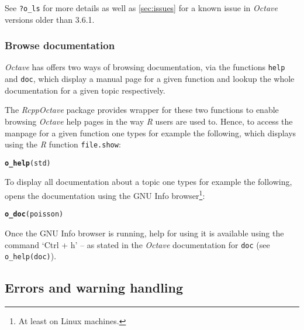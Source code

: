 \documentclass[english,10pt,a4paper]{article}\usepackage[]{graphicx}\usepackage[]{color}
\makeatletter
\newcommand{\hlstd}[1]{\textcolor[rgb]{0.345,0.345,0.345}{#1}}%
\newcommand{\hlkwd}[1]{\textcolor[rgb]{0.737,0.353,0.396}{\textbf{#1}}}%
\newenvironment{kframe}{%
 \def\at@end@of@kframe{}%
 \ifinner\ifhmode%
  \def\at@end@of@kframe{\end{minipage}}%
  \begin{minipage}{\columnwidth}%
 \fi\fi%
 \def\FrameCommand##1{\hskip\@totalleftmargin \hskip-\fboxsep
 \colorbox{shadecolor}{##1}\hskip-\fboxsep
     \hskip-\linewidth \hskip-\@totalleftmargin \hskip\columnwidth}%
 \MakeFramed {\advance\hsize-\width
   \@totalleftmargin\z@ \linewidth\hsize
   \@setminipage}}%
 {\par\unskip\endMakeFramed%
 \at@end@of@kframe}
\newenvironment{knitrout}{}{} %
\let\proglang=\textit
\let\code=\texttt
\newcommand{\pkgname}[1]{\textit{#1}\xspace}
\newcommand{\Rpkg}[1]{\pkgname{#1} package\xspace}
\newcommand{\R}{\proglang{R}\xspace}
\newcommand{\octave}{\proglang{Octave}\xspace}
\makeatother
\begin{document}
See \code{?o\_ls} for more details as well as \cref{sec:issues} for a
known issue in \octave versions older than 3.6.1.

\subsubsection{Browse documentation}

\octave has offers two ways of browsing documentation, via the functions
\code{help} and \code{doc}, which display a manual page for a given function and
lookup the whole documentation for a given topic respectively.

The \Rpkg{RcppOctave} provides wrapper for these two functions to enable
browsing \octave help pages in the way \R users are used to.
Hence, to access the manpage for a given function one types for example the
following, which displays using the \R function \code{file.show}:
\begin{knitrout}
\color{fgcolor}\begin{kframe}
\begin{alltt}
\hlkwd{o_help}\hlstd{(std)}
\end{alltt}
\end{kframe}
\end{knitrout}

To display all documentation about a topic one types for example the following,
opens the documentation using the GNU Info browser\footnote{At least on
Linux machines.}:
\begin{knitrout}
\color{fgcolor}\begin{kframe}
\begin{alltt}
\hlkwd{o_doc}\hlstd{(poisson)}
\end{alltt}
\end{kframe}
\end{knitrout}
Once the GNU Info browser is running, help for using it is available using the
command `Ctrl + h' -- as stated in the \octave documentation for \code{doc} (see
\code{o\_help(doc)}).

\subsection{Errors and warning handling}
\end{document}
